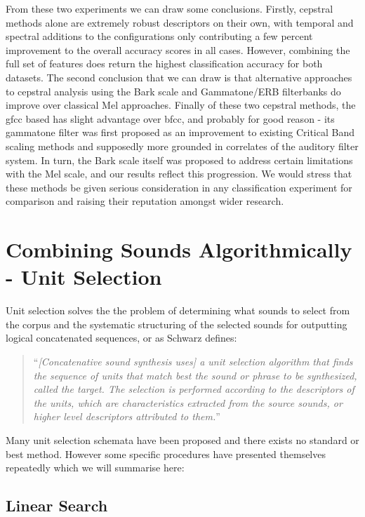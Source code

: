 {{{{{{{From these two experiments we can draw some conclusions. Firstly, cepstral methods alone are extremely robust descriptors on their own, with temporal and spectral additions to the configurations only contributing a few percent improvement to the overall accuracy scores in all cases. However, combining the full set of features does return the highest classification accuracy for both datasets. The second conclusion that we can draw is that alternative approaches to cepstral analysis using the Bark scale and Gammatone/ERB filterbanks do improve over classical Mel approaches.  Finally of these two cepstral methods, the \acrshort{gfcc} based has slight advantage over \acrshort{bfcc}, and probably for good reason - its gammatone filter was first proposed as an improvement to existing Critical Band scaling methods and supposedly more grounded in correlates of the auditory filter system. In turn, the Bark scale itself was proposed to address certain limitations with the Mel scale, and our results reflect this progression. We would stress that these methods be given serious consideration in any classification experiment for comparison and raising their reputation amongst wider research.

\section{Combining Sounds Algorithmically - Unit Selection}

Unit selection solves the the problem of determining what sounds to select from the corpus and the systematic structuring of the selected sounds for outputting logical concatenated sequences, or as Schwarz defines:

\blockcquote[]{Schwarz2006b}{``\textit{[Concatenative sound synthesis uses] a unit selection algorithm that finds the sequence of units that match best the sound or phrase to be synthesized, called the target. The selection is performed according to the descriptors of the units, which are characteristics extracted from the source sounds, or higher level descriptors attributed to them.}''} 

 Many unit selection schemata have been proposed and there exists no standard or best method. However some specific procedures have presented themselves repeatedly which we will summarise here:

\subsection{Linear Search}

}}}}}}}
